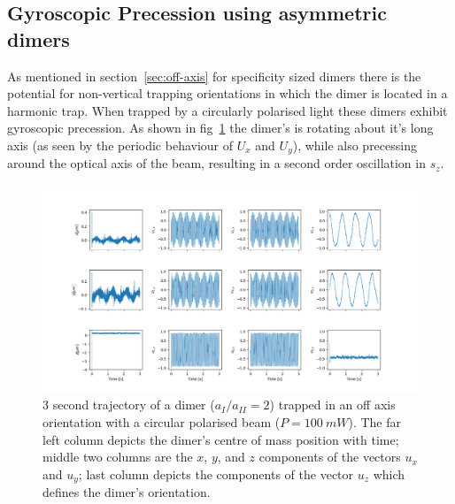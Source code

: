 \subsection{Gyroscopic Precession using asymmetric dimers}
As mentioned in section~\ref{sec:off-axis} for specificity 
sized dimers there is the potential for non-vertical trapping 
orientations in which the dimer is located in a harmonic 
trap. When trapped by a circularly polarised light these 
dimers exhibit gyroscopic precession. As shown in fig~\ref{fig:gyro} 
the dimer's is rotating about it's long axis (as seen by 
the periodic behaviour of $U_x$ and $U_y$), while also precessing 
around the optical axis of the beam, resulting in a second 
order oscillation in $s_z$.
\begin{figure}[h]
	\centering
	\includegraphics[width=\linewidth]{gyroscopic_precession.png}
	\caption{3 second trajectory of a dimer ($a_{I}/a_{II}=2$) trapped in an 
		off axis orientation with a circular polarised beam ($P= 100\ mW$). 
		The far left column depicts the dimer's centre of mass position with 
		time; middle two columns are the $x$, $y$, and $z$ components of the 
		vectors $u_x$ and $u_y$; last column depicts the components of the 
		vector $u_z$ which defines the dimer's orientation.}
	\label{fig:gyro}
\end{figure}

